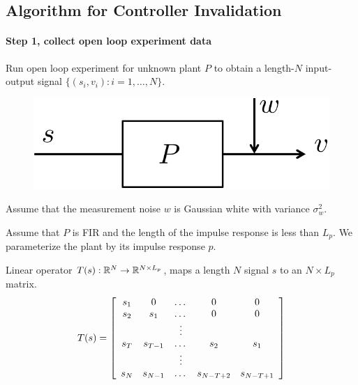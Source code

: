\documentclass[11pt, onecolumn]{article}
\begin{document}
\subsection{Algorithm for Controller Invalidation}

\paragraph{Step 1,  collect open loop experiment data}
Run open loop experiment for unknown plant $P$ to obtain a length-$N$ input-output signal $\{(s_i,v_i) :
i=1,\dots, N\}$.
\begin{figure}[!ht]
  \centering
  \includegraphics[width=.3\linewidth]{sys3.pdf}
\end{figure}

\begin{assumption}
  Assume that the measurement noise $w$ is Gaussian white with variance $\sigma_w^2$.
\end{assumption}

\begin{assumption}
  Assume that $P$ is FIR and the length of the impulse response is less than $L_p$. We parameterize
  the plant by its impulse response $p$.
\end{assumption}


\begin{definition}
  Linear operator $T(s): \mathbb R^N\to \mathbb R^{N\times L_p}$, maps a length $N$ signal $s$ to an $N\times L_p$
  matrix.
  \begin{align*}
    T(s) = \left[
    \begin{array}[c]{ccccc}
      s_1 & 0 &\dots & 0  & 0
      \\
      s_2 & s_1 & \dots  & 0  & 0
      \\
      & & \vdots & &
      \\
      s_{T} & s_{T-1} & \dots & s_{2} & s_{1}
      \\
      & & \vdots & &
      \\
      s_N & s_{N-1} & \dots & s_{N-T+2} & s_{N-T+1}
    \end{array}
\right]
  \end{align*}

\end{definition}
\end{document}
